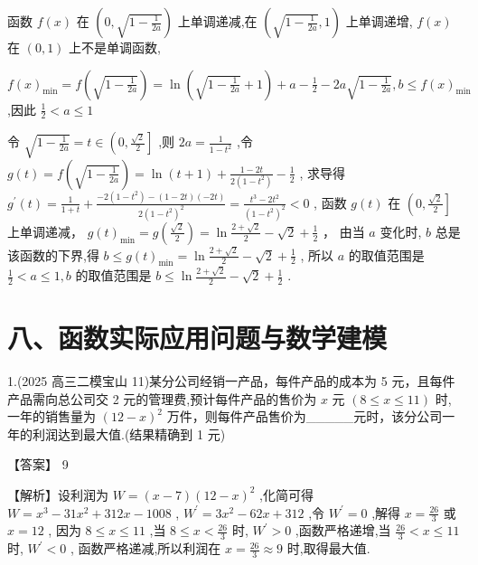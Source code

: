 \documentclass[10pt]{article}
\begin{document}
函数 \(f\left( x\right)\) 在 \(\left( {0,\sqrt{1 - \frac{1}{2a}}}\right)\) 上单调递减,在 \(\left( {\sqrt{1 - \frac{1}{2a}},1}\right)\) 上单调递增, \(f\left( x\right)\) 在 \(\left( {0,1}\right)\) 上不是单调函数,

\(f{\left( x\right) }_{\min } = f\left( \sqrt{1 - \frac{1}{2a}}\right)  = \ln \left( {\sqrt{1 - \frac{1}{2a}} + 1}\right)  + a - \frac{1}{2} - {2a}\sqrt{1 - \frac{1}{2a}},b \leq  f{\left( x\right) }_{\min }\) ,因此 \(\frac{1}{2} < a \leq  1\)

令 \(\sqrt{1 - \frac{1}{2a}} = t \in  \left( {0,\frac{\sqrt{2}}{2}}\right\rbrack\) ,则 \({2a} = \frac{1}{1 - {t}^{2}}\) ,令 \(g\left( t\right)  = f\left( \sqrt{1 - \frac{1}{2a}}\right)  = \ln \left( {t + 1}\right)  + \frac{1 - {2t}}{2\left( {1 - {t}^{2}}\right) } - \frac{1}{2}\) , 求导得 \({g}^{\prime }\left( t\right)  = \frac{1}{1 + t} + \frac{-2\left( {1 - {t}^{2}}\right)  - \left( {1 - {2t}}\right) \left( {-{2t}}\right) }{2{\left( 1 - {t}^{2}\right) }^{2}} = \frac{{t}^{3} - 2{t}^{2}}{{\left( 1 - {t}^{2}\right) }^{2}} < 0\) , 函数 \(g\left( t\right)\) 在 \(\left( {0,\frac{\sqrt{2}}{2}}\right\rbrack\) 上单调递减， \(g{\left( t\right) }_{\min } = g\left( \frac{\sqrt{2}}{2}\right)  = \ln \frac{2 + \sqrt{2}}{2} - \sqrt{2} + \frac{1}{2}\) ， 由当 \(a\) 变化时, \(b\) 总是该函数的下界,得 \(b \leq  g{\left( t\right) }_{\min } = \ln \frac{2 + \sqrt{2}}{2} - \sqrt{2} + \frac{1}{2}\) , 所以 \(a\) 的取值范围是 \(\frac{1}{2} < a \leq  1,b\) 的取值范围是 \(b \leq  \ln \frac{2 + \sqrt{2}}{2} - \sqrt{2} + \frac{1}{2}\) .

\section*{八、函数实际应用问题与数学建模}

1.(2025 高三二模宝山 11)某分公司经销一产品，每件产品的成本为 5 元，且每件产品需向总公司交 2 元的管理费,预计每件产品的售价为 \(x\) 元 \(\left( {8 \leq  x \leq  {11}}\right)\) 时,一年的销售量为 \({\left( {12} - x\right) }^{2}\) 万件，则每件产品售价为\_\_\_\_\_元时，该分公司一年的利润达到最大值.(结果精确到 1 元)

【答案】 9

【解析】设利润为 \(W = \left( {x - 7}\right) {\left( {12} - x\right) }^{2}\) ,化简可得 \(W = {x}^{3} - {31}{x}^{2} + {312x} - {1008}\) , \({W}^{\prime } = 3{x}^{2} - {62x} + {312}\) ,令 \({W}^{\prime } = 0\) ,解得 \(x = \frac{26}{3}\) 或 \(x = {12}\) , 因为 \(8 \leq  x \leq  {11}\) ,当 \(8 \leq  x < \frac{26}{3}\) 时, \({W}^{\prime } > 0\) ,函数严格递增,当 \(\frac{26}{3} < x \leq  {11}\) 时, \({W}^{\prime } < 0\) , 函数严格递减,所以利润在 \(x = \frac{26}{3} \approx  9\) 时,取得最大值.
\end{document}
